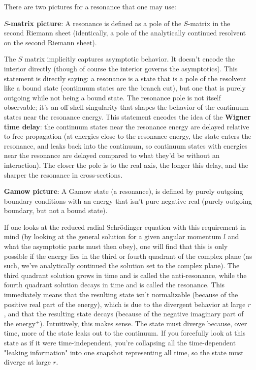 There are two pictures for a resonance that one may use:

\textbf{$S$-matrix picture}: A resonance is defined as a pole of the $S$-matrix in the second Riemann sheet (identically, a pole of the analytically continued resolvent on the second Riemann sheet).

The $S$ matrix implicitly captures asymptotic behavior. It doesn't encode the interior directly (though of course the interior governs the asymptotics). This statement is directly saying: a resonance is a state that is a pole of the resolvent like a bound state (continuum states are the branch cut), but one that is purely outgoing while not being a bound state. The resonance pole is not itself observable; it's an off-shell singularity that shapes the behavior of the continuum states near the resonance energy. This statement encodes the idea of the \textbf{Wigner time delay}: the continuum states near the resonance energy are delayed relative to free propagation (at energies close to the resonance energy, the state enters the resonance, and leaks back into the continuum, so continuum states with energies near the resonance are delayed compared to what they'd be without an interaction). The closer the pole is to the real axis, the longer this delay, and the sharper the resonance in cross-sections.

\textbf{Gamow picture}: A Gamow state (a resonance), is defined by purely outgoing boundary conditions with an energy that isn't pure negative real (purely outgoing boundary, but not a bound state).

If one looks at the reduced radial Schr{\"o}dinger equation with this requirement in mind (by looking at the general solution for a given angular momentum $l$ and what the asymptotic parts must then obey), one will find that this is only possible if the energy lies in the third or fourth quadrant of the complex plane (as such, we've analytically continued the solution set to the complex plane). The third quadrant solution grows in time and is called the anti-resonance, while the fourth quadrant solution decays in time and is called the resonance. This immediately means that the resulting state isn't normalizable (because of the positive real part of the energy), which is due to the divergent behavior at large $r$, and that the resulting state decays (because of the negative imaginary part of the energy$^+$). Intuitively, this makes sense. The state must diverge because, over time, more of the state leaks out to the continuum. If you forcefully look at this state as if it were time-independent, you're collapsing all the time-dependent "leaking information" into one snapshot representing all time, so the state must diverge at large $r$.

